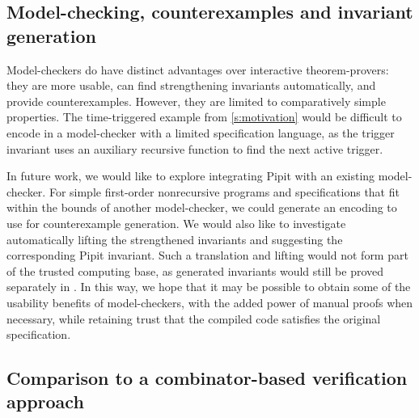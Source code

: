 \subsection{Model-checking, counterexamples and invariant generation}
Model-checkers do have distinct advantages over interactive theorem-provers: they are more usable, can find strengthening invariants automatically, and provide counterexamples.
However, they are limited to comparatively simple properties.
The time-triggered example from \autoref{s:motivation} would be difficult to encode in a model-checker with a limited specification language, as the trigger invariant uses an auxiliary recursive function to find the next active trigger.

In future work, we would like to explore integrating Pipit with an existing model-checker.
For simple first-order nonrecursive programs and specifications that fit within the bounds of another model-checker, we could generate an encoding to use for counterexample generation.
We would also like to investigate automatically lifting the strengthened invariants and suggesting the corresponding Pipit invariant.
Such a translation and lifting would not form part of the trusted computing base, as generated invariants would still be proved separately in \fstar{}.
In this way, we hope that it may be possible to obtain some of the usability benefits of model-checkers, with the added power of manual proofs when necessary, while retaining trust that the compiled code satisfies the original specification.

\subsection{Comparison to a combinator-based verification approach}



